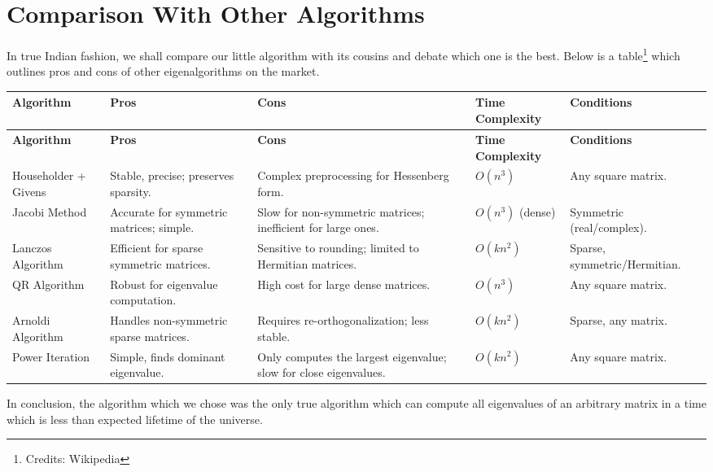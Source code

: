 
\chapter{Comparison With Other Algorithms} %

\label{Chapter6}



In true Indian fashion, we shall compare our little algorithm with its cousins and debate which one is the best. Below is a table\footnote{Credits: Wikipedia} which outlines pros and cons of other eigenalgorithms on the market.

\begin{longtable}{|p{2.5cm}|p{3.5cm}|p{3.5cm}|p{2.5cm}|p{2.5cm}|}
\hline
\textbf{Algorithm} & \textbf{Pros} & \textbf{Cons} & \textbf{Time Complexity} & \textbf{Conditions} \\ \hline
\endfirsthead
\hline
\textbf{Algorithm} & \textbf{Pros} & \textbf{Cons} & \textbf{Time Complexity} & \textbf{Conditions} \\ \hline
\endhead
Householder + Givens & Stable, precise; preserves sparsity. & Complex preprocessing for Hessenberg form. & \( O(n^3) \) & Any square matrix. \\ \hline
Jacobi Method & Accurate for symmetric matrices; simple. & Slow for non-symmetric matrices; inefficient for large ones. & \( O(n^3) \) (dense) & Symmetric (real/complex). \\ \hline
Lanczos Algorithm & Efficient for sparse symmetric matrices. & Sensitive to rounding; limited to Hermitian matrices. & \( O(kn^2) \) & Sparse, symmetric/Hermitian. \\ \hline
QR Algorithm & Robust for eigenvalue computation. & High cost for large dense matrices. & \( O(n^3) \) & Any square matrix. \\ \hline
Arnoldi Algorithm & Handles non-symmetric sparse matrices. & Requires re-orthogonalization; less stable. & \( O(kn^2) \) & Sparse, any matrix. \\ \hline
Power Iteration & Simple, finds dominant eigenvalue. & Only computes the largest eigenvalue; slow for close eigenvalues. & \( O(kn^2) \) & Any square matrix. \\ \hline
\end{longtable}

In conclusion, the algorithm which we chose was the only true algorithm which can compute all eigenvalues of an arbitrary matrix in a time which is less than expected lifetime of the universe.

